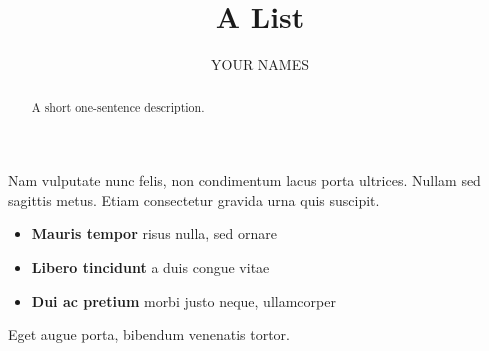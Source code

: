 \documentclass{ximera}
\author{YOUR NAMES}
\title{A List}
\begin{document}
\begin{abstract}
    A short one-sentence description.
\end{abstract}
\maketitle

Nam vulputate nunc felis, non condimentum lacus porta ultrices. Nullam sed
sagittis metus. Etiam consectetur gravida urna quis suscipit.

\begin{itemize}
  \item \textbf{Mauris tempor} risus nulla, sed ornare
  \item \textbf{Libero tincidunt} a duis congue vitae
  \item \textbf{Dui ac pretium} morbi justo neque, ullamcorper
\end{itemize}

Eget augue porta, bibendum venenatis tortor.
\end{document}
